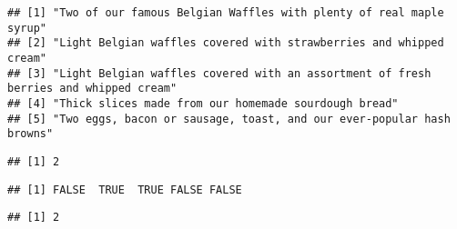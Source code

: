 \documentclass[
]{article}
\newenvironment{Shaded}{\begin{snugshade}}{\end{snugshade}}
\newcommand{\FunctionTok}[1]{\textcolor[rgb]{0.00,0.00,0.00}{#1}}
\newcommand{\NormalTok}[1]{#1}
\newcommand{\SpecialCharTok}[1]{\textcolor[rgb]{0.00,0.00,0.00}{#1}}
\newcommand{\StringTok}[1]{\textcolor[rgb]{0.31,0.60,0.02}{#1}}
\begin{document}
\begin{Shaded}
\end{Shaded}

\begin{verbatim}
## [1] "Two of our famous Belgian Waffles with plenty of real maple syrup"                  
## [2] "Light Belgian waffles covered with strawberries and whipped cream"                  
## [3] "Light Belgian waffles covered with an assortment of fresh berries and whipped cream"
## [4] "Thick slices made from our homemade sourdough bread"                                
## [5] "Two eggs, bacon or sausage, toast, and our ever-popular hash browns"
\end{verbatim}

\begin{Shaded}
\end{Shaded}

\begin{verbatim}
## [1] 2
\end{verbatim}

\begin{Shaded}
\end{Shaded}

\begin{verbatim}
## [1] FALSE  TRUE  TRUE FALSE FALSE
\end{verbatim}

\begin{Shaded}
\end{Shaded}

\begin{verbatim}
## [1] 2
\end{verbatim}
\end{document}

